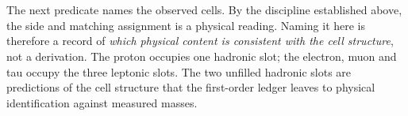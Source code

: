 \documentclass[11pt]{article}
\begin{document}
\begin{code}
\AgdaSymbol{:}\AgdaSpace{}%
\AgdaSpace{}%
\AgdaSpace{}%
\<%
\\
\>[0]\AgdaSpace{}%
\AgdaSymbol{=}\AgdaSpace{}%
\<%
\\
%
\\[\AgdaEmptyExtraSkip]%
\>[0]\AgdaSpace{}%
\AgdaSymbol{:}\<%
\\
\>[0][@{}l@{\AgdaIndent{0}}]%
\>[2]\AgdaSpace{}%
\AgdaSpace{}%
\AgdaSpace{}%
\<%
\\
\>[0]\AgdaSpace{}%
\AgdaSymbol{=}\AgdaSpace{}%
\<%
\\
%
\\[\AgdaEmptyExtraSkip]%
\>[0]\AgdaSpace{}%
\AgdaSymbol{:}\AgdaSpace{}%
\<%
\\
\>[0]\AgdaSpace{}%
\AgdaSymbol{=}\AgdaSpace{}%
\<%
\\
%
\\[\AgdaEmptyExtraSkip]%
\>[0]\AgdaSpace{}%
\AgdaSymbol{:}\<%
\\
\>[0][@{}l@{\AgdaIndent{0}}]%
\>[2]\AgdaSpace{}%
\AgdaSpace{}%
\<%
\\
\>[0]\AgdaSpace{}%
\AgdaSymbol{=}\AgdaSpace{}%
\<%
\end{code}

The next predicate names the observed cells.  By the discipline
established above, the side and matching assignment is a physical
reading.  Naming it here is therefore a record of \emph{which physical
content is consistent with the cell structure}, not a derivation.  The
proton occupies one hadronic slot; the electron, muon and tau occupy
the three leptonic slots.  The two unfilled hadronic slots are
predictions of the cell structure that the first-order ledger leaves to
physical identification against measured masses.
\end{document}
